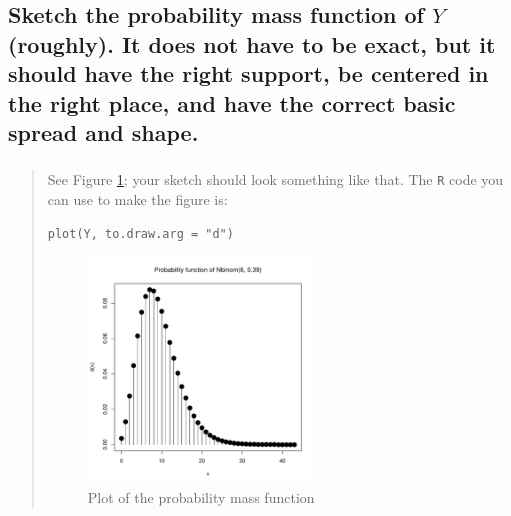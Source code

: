 \documentclass[11pt]{article}
\begin{document}
\subsection[Sketch the probability mass function of \(Y\) (roughly). It does not have to be exact, but it should have the right support, be centered in the right place, and have the correct basic spread and shape.]{Sketch the probability mass function of \(Y\) (roughly). It does not have to be exact, but it should have the right support, be centered in the right place, and have the correct basic spread and shape.}
\label{sec-2-3}

\subsubsection[]{}
\label{sec-2-3-1}
\begin{quote}
See Figure \ref{fig-pmf}; your sketch should look something like that.  The \texttt{R} code you can use to make the figure is:

\label{pmf}
\begin{verbatim}
plot(Y, to.draw.arg = "d")
\end{verbatim}

\begin{figure}[htb]
\centering
\includegraphics[width=6cm]{plotpmf.pdf}
\caption{\label{fig-pmf}Plot of the probability mass function}
\end{figure}

\end{quote}
\end{document}
